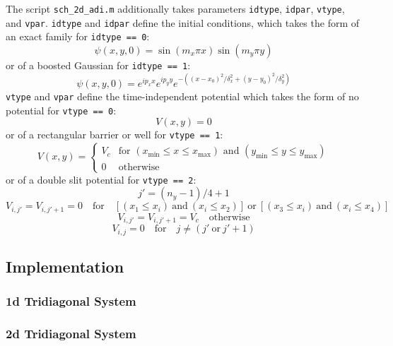 \documentclass[10pt]{article}
\def\code#1{\texttt{#1}} %
\begin{document}
The script \code{sch\_2d\_adi.m} additionally takes parameters \code{idtype}, \code{idpar}, 
\code{vtype}, and \code{vpar}. \code{idtype} and \code{idpar} define the initial conditions, 
which takes the form of an exact family for \code{idtype == 0}:
$$\psi(x,y,0) = \sin(m_x \pi x) \sin(m_y \pi y)$$
or of a boosted Gaussian for \code{idtype == 1}: 
$$\psi(x,y,0) = e^{i p_x x} e^{i p_y y} e^{-((x - x_0)^2 / \delta_x^2 + (y - y_0)^2 / \delta_y^2)}$$
\code{vtype} and \code{vpar} define the time-independent potential which takes the form of no 
potential for \code{vtype == 0}:
$$V(x,y) = 0$$
or of a rectangular barrier or well for \code{vtype == 1}:
$$V(x, y) = 
\begin{cases} 
V_c & \text{for } (x_{\min} \leq x \leq x_{\max}) \text{ and } (y_{\min} \leq y \leq y_{\max}) \\
0 & \text{otherwise}
\end{cases}$$
or of a double slit potential for \code{vtype == 2}:
$$j' = (n_y - 1) / 4 + 1$$
$$V_{i,j'} = V_{i,j'+1} = 0 \quad \text{for} \quad 
\left[ (x_1 \leq x_i) \ \text{and} \ (x_i \leq x_2) \right] \ \text{or} \ 
\left[ (x_3 \leq x_i) \ \text{and} \ (x_i \leq x_4) \right]$$
$$V_{i,j'} = V_{i,j'+1} = V_c \quad \text{otherwise}$$
$$V_{i,j} = 0 \quad \text{for} \quad j \neq (j' \ \text{or} \ j'+1)$$

\subsection*{Implementation}

\subsubsection*{1d Tridiagonal System}


\subsubsection*{2d Tridiagonal System}


\end{document}
